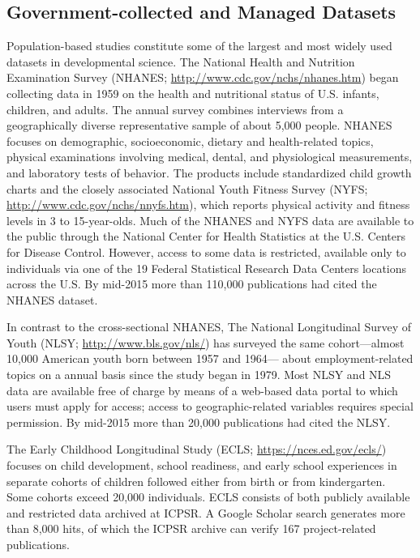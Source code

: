 \documentclass[letterpaper,man,apacite,natbib]{apa6}
\begin{document}
\subsection{Government-collected and Managed Datasets}
Population-based studies constitute some of the largest and most widely used datasets in developmental science.
The National Health and Nutrition Examination Survey (NHANES; \url{http://www.cdc.gov/nchs/nhanes.htm}) began collecting data in 1959 on the health and nutritional status of U.S. infants, children, and adults. 
The annual survey combines interviews from a geographically diverse representative sample of about 5,000 people.
NHANES focuses on demographic, socioeconomic, dietary and health-related topics, physical examinations involving medical, dental, and physiological measurements, and laboratory tests of behavior.
The products include standardized child growth charts and the closely associated National Youth Fitness Survey (NYFS; \url{http://www.cdc.gov/nchs/nnyfs.htm}), which reports physical activity and fitness levels in 3 to 15-year-olds.
Much of the NHANES and NYFS data are available to the public through the National Center for Health Statistics at the U.S. Centers for Disease Control.
However, access to some data is restricted, available only to individuals via one of the 19 Federal Statistical Research Data Centers locations across the U.S.
By mid-2015 more than 110,000 publications had cited the NHANES dataset.

In contrast to the cross-sectional NHANES, The National Longitudinal Survey of Youth (NLSY; \url{http://www.bls.gov/nls/}) has surveyed the same cohort---almost 10,000 American youth born between 1957 and 1964--- about employment-related topics on a annual basis since the study began in 1979.
Most NLSY and NLS data are available free of charge by means of a web-based data portal to which users must apply for access; access to geographic-related variables requires special permission.
By mid-2015 more than 20,000 publications had cited the NLSY.

The Early Childhood Longitudinal Study (ECLS; \url{https://nces.ed.gov/ecls/}) focuses on child development, school readiness, and early school experiences in separate cohorts of children followed either from birth or from kindergarten.
Some cohorts exceed 20,000 individuals.
ECLS consists of both publicly available and restricted data archived at ICPSR.
A Google Scholar search generates more than 8,000 hits, of which the ICPSR archive can verify 167 project-related publications.
\end{document}
